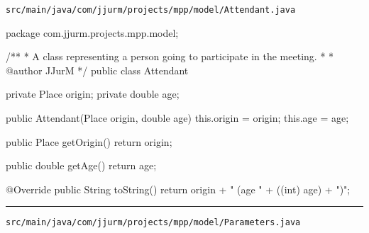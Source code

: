\nointerlineskip
\texttt{src/main/java/com/jjurm/projects/mpp/model/Attendant.java}

\begin{javacode}
package com.jjurm.projects.mpp.model;

/**
 * A class representing a person going to participate in the meeting.
 * 
 * @author JJurM
 */
public class Attendant {

  private Place origin;
  private double age;

  public Attendant(Place origin, double age) {
    this.origin = origin;
    this.age = age;
  }

  public Place getOrigin() {
    return origin;
  }

  public double getAge() {
    return age;
  }

  @Override
  public String toString() {
    return origin + " (age " + ((int) age) + ")";
  }

}
\end{javacode}

\noindent\rule{\textwidth}{0.4pt}

\nointerlineskip
\texttt{src/main/java/com/jjurm/projects/mpp/model/Parameters.java}

